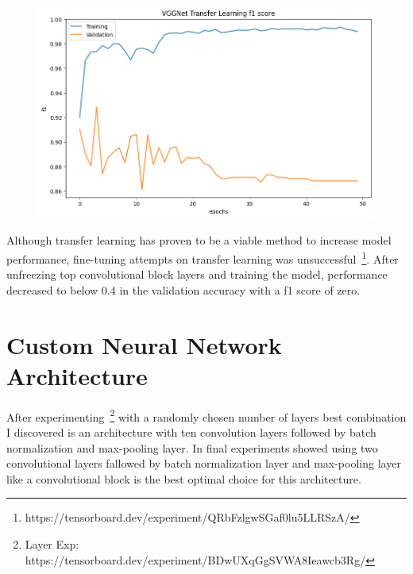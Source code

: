 \begin{figure}[H]
    \centering
    \includegraphics[width=.8\textwidth]{img/vggnettff1.png}
    \caption{}
    \label{fig:vggtff1}
\end{figure}

Although transfer learning has proven to be a viable method to increase model performance, fine-tuning attempts on transfer learning was unsuccessful~\footnote{https://tensorboard.dev/experiment/QRbFzlgwSGaf0lu5LLRSzA/}.
After unfreezing top convolutional block layers and training the model, performance decreased to below 0.4 in the validation accuracy with a f1 score of zero.

\section{Custom Neural Network Architecture}
After experimenting~\footnote{Layer Exp: https://tensorboard.dev/experiment/BDwUXqGgSVWA8Ieawcb3Rg/} with a randomly chosen number of layers best combination I discovered is an architecture with ten convolution layers followed by batch normalization and max-pooling layer. 
In final experiments showed using two convolutional layers fallowed by batch normalization layer and max-pooling layer like a convolutional block is the best optimal choice for this architecture.

